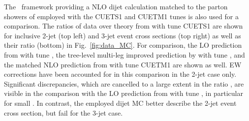 The \POWHEG~framework providing a NLO dijet calculation matched to the parton showers of \PYTHIAE employed with the CUETS1 and CUETM1 tunes \cite{Khachatryan:2015pea} is also used for a comparison. The ratios of data over theory from \POWHEGn \plusn \PYTHIAE with tune CUETS1 are shown for inclusive 2-jet (top left) and 3-jet event cross sections (top right) as well as their ratio \ratio (bottom) in Fig.~\ref{fig:data_MC}. For comparison, the LO prediction from \PYTHIAS with tune \Ztwostar, the tree-level multi-leg improved prediction by \MadGraphFn \plusn \PYTHIAS with tune \Ztwostar, and the matched NLO prediction from \POWHEGn \plusn \PYTHIAE with tune CUETM1 are shown as well. EW corrections have been accounted for in this comparison in the 2-jet case only. Significant discrepancies, which are cancelled to a large extent in the ratio \ratio, are visible in the comparison with the LO prediction from \MadGraphFn \plusn \PYTHIAS with tune \Ztwostar, in particular for small \httwo. In contrast, the employed dijet MC \POWHEGn \plusn \PYTHIAE better describe the 2-jet event cross section, but fail for the 3-jet case.

